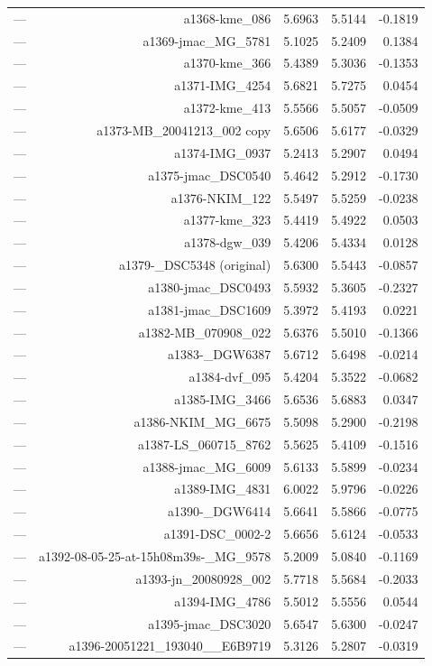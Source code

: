 \begin{table}[htbp]
\begin{tabular}{lrrrr}
— & a1368-kme_086 & 5.6963 & 5.5144 & -0.1819 \\
— & a1369-jmac_MG_5781 & 5.1025 & 5.2409 & 0.1384 \\
— & a1370-kme_366 & 5.4389 & 5.3036 & -0.1353 \\
— & a1371-IMG_4254 & 5.6821 & 5.7275 & 0.0454 \\
— & a1372-kme_413 & 5.5566 & 5.5057 & -0.0509 \\
— & a1373-MB_20041213_002 copy & 5.6506 & 5.6177 & -0.0329 \\
— & a1374-IMG_0937 & 5.2413 & 5.2907 & 0.0494 \\
— & a1375-jmac_DSC0540 & 5.4642 & 5.2912 & -0.1730 \\
— & a1376-NKIM_122 & 5.5497 & 5.5259 & -0.0238 \\
— & a1377-kme_323 & 5.4419 & 5.4922 & 0.0503 \\
— & a1378-dgw_039 & 5.4206 & 5.4334 & 0.0128 \\
— & a1379-_DSC5348 (original) & 5.6300 & 5.5443 & -0.0857 \\
— & a1380-jmac_DSC0493 & 5.5932 & 5.3605 & -0.2327 \\
— & a1381-jmac_DSC1609 & 5.3972 & 5.4193 & 0.0221 \\
— & a1382-MB_070908_022 & 5.6376 & 5.5010 & -0.1366 \\
— & a1383-_DGW6387 & 5.6712 & 5.6498 & -0.0214 \\
— & a1384-dvf_095 & 5.4204 & 5.3522 & -0.0682 \\
— & a1385-IMG_3466 & 5.6536 & 5.6883 & 0.0347 \\
— & a1386-NKIM_MG_6675 & 5.5098 & 5.2900 & -0.2198 \\
— & a1387-LS_060715_8762 & 5.5625 & 5.4109 & -0.1516 \\
— & a1388-jmac_MG_6009 & 5.6133 & 5.5899 & -0.0234 \\
— & a1389-IMG_4831 & 6.0022 & 5.9796 & -0.0226 \\
— & a1390-_DGW6414 & 5.6641 & 5.5866 & -0.0775 \\
— & a1391-DSC_0002-2 & 5.6656 & 5.6124 & -0.0533 \\
— & a1392-08-05-25-at-15h08m39s-_MG_9578 & 5.2009 & 5.0840 & -0.1169 \\
— & a1393-jn_20080928_002 & 5.7718 & 5.5684 & -0.2033 \\
— & a1394-IMG_4786 & 5.5012 & 5.5556 & 0.0544 \\
— & a1395-jmac_DSC3020 & 5.6547 & 5.6300 & -0.0247 \\
— & a1396-20051221_193040__E6B9719 & 5.3126 & 5.2807 & -0.0319 \\

\end{tabular}
\end{table}
